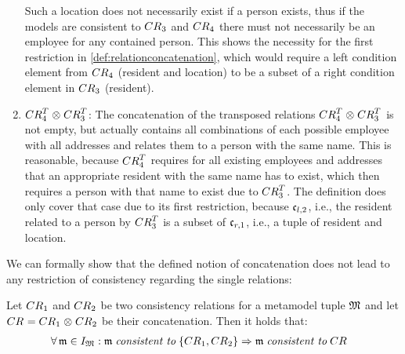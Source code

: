 \begin{example}
\begin{enumerate}
Such a location does not necessarily exist if a person exists, thus if the models are consistent to $\consistencyrelation{CR}{3}$ and $\consistencyrelation{CR}{4}$ there must not necessarily be an employee for any contained person.
This shows the necessity for the first restriction in \autoref{def:relationconcatenation}, which would require a left condition element from $\consistencyrelation{CR}{4}$ (resident and location) to be a subset of a right condition element in $\consistencyrelation{CR}{3}$ (resident).
    \item $\consistencyrelation{CR}{4}^T \concat \consistencyrelation{CR}{3}^T$: 
The concatenation of the transposed relations $\consistencyrelation{CR}{4}^T \concat \consistencyrelation{CR}{3}^T$ is not empty, but actually contains all combinations of each possible employee with all addresses and relates them to a person with the same name.
This is reasonable, because $\consistencyrelation{CR}{4}^T$ requires for all existing employees and addresses that an appropriate resident with the same name %
has to exist, which then requires a person with that name to exist due to $\consistencyrelation{CR}{3}^T$.
The definition does only cover that case due to its first restriction, because $\conditionelement{c}{l,2}$, i.e., the resident related to a person by $\consistencyrelation{CR}{3}^T$ is a subset of $\conditionelement{c}{r,1}$, i.e., a tuple of resident and location.
\end{enumerate}
\end{example}

We can formally show that the defined notion of concatenation does not lead to any restriction of consistency regarding the single relations:

\begin{lemma} \label{lemma:concatenationimpliesconsistency}
    Let $\consistencyrelation{CR}{1}$ and $\consistencyrelation{CR}{2}$ be two consistency relations for a metamodel tuple $\metamodeltuple{M}$ and let $\consistencyrelation{CR}{} = \consistencyrelation{CR}{1} \concat \consistencyrelation{CR}{2}$ be their concatenation. Then it holds that:
    \begin{align*}
        &
        \forall \modeltuple{m} \in \metamodeltupleinstanceset{M}: \modeltuple{m} \consistenttomath \setted{\consistencyrelation{CR}{1}, \consistencyrelation{CR}{2}} \Rightarrow \modeltuple{m} \consistenttomath \consistencyrelation{CR}{}
    \end{align*}
\end{lemma}

